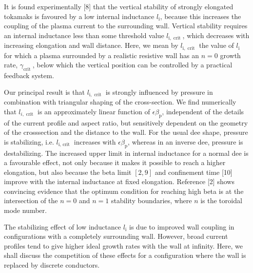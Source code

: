 \documentclass[10pt]{article}
\begin{document}
It is found experimentally [8] that the vertical stability of strongly elongated tokamaks is favoured by a low internal inductance $l_{\mathrm{i}}$, because this increases the coupling of the plasma current to the surrounding wall. Vertical stability requires an internal inductance less than some threshold value $l_{\mathrm{i}, \text { crit }}$, which decreases with\\
increasing elongation and wall distance. Here, we mean by $l_{\mathrm{i}, \text { crit }}$ the value of $l_{\mathrm{i}}$ for which a plasma surrounded by a realistic resistive wall has an $n=0$ growth rate, $\gamma_{\text {crit }}$, below which the vertical position can be controlled by a practical feedback system.

Our principal result is that $l_{\mathrm{i}, \text { crit }}$ is strongly influenced by pressure in combination with triangular shaping of the cross-section. We find numerically that $l_{i, \text { crit }}$ is an approximately linear function of $\epsilon \beta_{\mathrm{p}}$, independent of the details of the current profile and aspect ratio, but sensitively dependent on the geometry of the crosssection and the distance to the wall. For the usual dee shape, pressure is stabilizing, i.e. $l_{\mathrm{i} \text {, crit }}$ increases with $\epsilon \beta_{\mathrm{p}}$, whereas in an inverse dee, pressure is destabilizing. The increased upper limit in internal inductance for a normal dee is a favourable effect, not only because it makes it possible to reach a higher elongation, but also because the beta limit $[2,9]$ and confinement time [10] improve with the internal inductance at fixed elongation. Reference [2] shows convincing evidence that the optimum condition for reaching high beta is at the intersection of the $n=0$ and $n=1$ stability boundaries, where $n$ is the toroidal mode number.

The stabilizing effect of low inductance $l_{\mathrm{i}}$ is due to improved wall coupling in configurations with a completely surrounding wall. However, broad current profiles tend to give higher ideal growth rates with the wall at infinity. Here, we shall discuss the competition of these effects for a configuration where the wall is replaced by discrete conductors.
\end{document}
